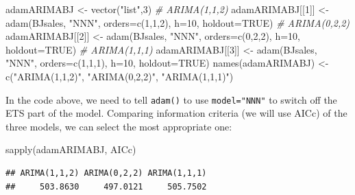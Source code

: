 \documentclass[
]{book}
\newenvironment{Shaded}{\begin{snugshade}}{\end{snugshade}}
\newcommand{\AttributeTok}[1]{\textcolor[rgb]{0.77,0.63,0.00}{#1}}
\newcommand{\CommentTok}[1]{\textcolor[rgb]{0.56,0.35,0.01}{\textit{#1}}}
\newcommand{\ConstantTok}[1]{\textcolor[rgb]{0.00,0.00,0.00}{#1}}
\newcommand{\DecValTok}[1]{\textcolor[rgb]{0.00,0.00,0.81}{#1}}
\newcommand{\FunctionTok}[1]{\textcolor[rgb]{0.00,0.00,0.00}{#1}}
\newcommand{\NormalTok}[1]{#1}
\newcommand{\OtherTok}[1]{\textcolor[rgb]{0.56,0.35,0.01}{#1}}
\newcommand{\StringTok}[1]{\textcolor[rgb]{0.31,0.60,0.02}{#1}}
\theoremstyle{definition}
\theoremstyle{definition}
\theoremstyle{definition}
\theoremstyle{definition}
\theoremstyle{remark}
\begin{document}
\begin{Shaded}
\begin{Highlighting}[]
\NormalTok{adamARIMABJ }\OtherTok{\textless{}{-}} \FunctionTok{vector}\NormalTok{(}\StringTok{"list"}\NormalTok{,}\DecValTok{3}\NormalTok{)}
\CommentTok{\# ARIMA(1,1,2)}
\NormalTok{adamARIMABJ[[}\DecValTok{1}\NormalTok{]] }\OtherTok{\textless{}{-}} \FunctionTok{adam}\NormalTok{(BJsales, }\StringTok{"NNN"}\NormalTok{, }\AttributeTok{orders=}\FunctionTok{c}\NormalTok{(}\DecValTok{1}\NormalTok{,}\DecValTok{1}\NormalTok{,}\DecValTok{2}\NormalTok{),}
                         \AttributeTok{h=}\DecValTok{10}\NormalTok{, }\AttributeTok{holdout=}\ConstantTok{TRUE}\NormalTok{)}
\CommentTok{\# ARIMA(0,2,2)}
\NormalTok{adamARIMABJ[[}\DecValTok{2}\NormalTok{]] }\OtherTok{\textless{}{-}} \FunctionTok{adam}\NormalTok{(BJsales, }\StringTok{"NNN"}\NormalTok{, }\AttributeTok{orders=}\FunctionTok{c}\NormalTok{(}\DecValTok{0}\NormalTok{,}\DecValTok{2}\NormalTok{,}\DecValTok{2}\NormalTok{),}
                         \AttributeTok{h=}\DecValTok{10}\NormalTok{, }\AttributeTok{holdout=}\ConstantTok{TRUE}\NormalTok{)}
\CommentTok{\# ARIMA(1,1,1)}
\NormalTok{adamARIMABJ[[}\DecValTok{3}\NormalTok{]] }\OtherTok{\textless{}{-}} \FunctionTok{adam}\NormalTok{(BJsales, }\StringTok{"NNN"}\NormalTok{, }\AttributeTok{orders=}\FunctionTok{c}\NormalTok{(}\DecValTok{1}\NormalTok{,}\DecValTok{1}\NormalTok{,}\DecValTok{1}\NormalTok{),}
                         \AttributeTok{h=}\DecValTok{10}\NormalTok{, }\AttributeTok{holdout=}\ConstantTok{TRUE}\NormalTok{)}
\FunctionTok{names}\NormalTok{(adamARIMABJ) }\OtherTok{\textless{}{-}} \FunctionTok{c}\NormalTok{(}\StringTok{"ARIMA(1,1,2)"}\NormalTok{, }\StringTok{"ARIMA(0,2,2)"}\NormalTok{,}
                        \StringTok{"ARIMA(1,1,1)"}\NormalTok{)}
\end{Highlighting}
\end{Shaded}

In the code above, we need to tell \texttt{adam()} to use \texttt{model="NNN"} to switch off the ETS part of the model. Comparing information criteria (we will use AICc) of the three models, we can select the most appropriate one:

\begin{Shaded}
\begin{Highlighting}[]
\FunctionTok{sapply}\NormalTok{(adamARIMABJ, AICc)}
\end{Highlighting}
\end{Shaded}

\begin{verbatim}
## ARIMA(1,1,2) ARIMA(0,2,2) ARIMA(1,1,1) 
##     503.8630     497.0121     505.7502
\end{verbatim}
\end{document}
